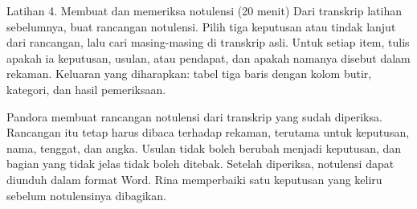 \begin{kegiatan}{Latihan 4. Membuat dan memeriksa notulensi (20 menit)}
Dari transkrip latihan sebelumnya, buat rancangan notulensi. Pilih tiga keputusan atau tindak lanjut dari rancangan, lalu cari masing-masing di transkrip asli. Untuk setiap item, tulis apakah ia keputusan, usulan, atau pendapat, dan apakah namanya disebut dalam rekaman. Keluaran yang diharapkan: tabel tiga baris dengan kolom butir, kategori, dan hasil pemeriksaan.
\end{kegiatan}

\begin{rangkuman}
Pandora membuat rancangan notulensi dari transkrip yang sudah diperiksa. Rancangan itu tetap harus dibaca terhadap rekaman, terutama untuk keputusan, nama, tenggat, dan angka. Usulan tidak boleh berubah menjadi keputusan, dan bagian yang tidak jelas tidak boleh ditebak. Setelah diperiksa, notulensi dapat diunduh dalam format Word. Rina memperbaiki satu keputusan yang keliru sebelum notulensinya dibagikan.
\end{rangkuman}
